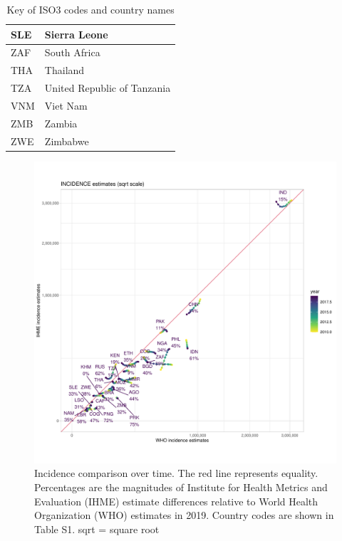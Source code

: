 \documentclass[12pt]{article}
\begin{document}
\begin{table}[]
\begin{tabular}{|l|l|}
SLE           & Sierra Leone                          \\ \hline
ZAF           & South Africa                          \\ \hline
THA           & Thailand                              \\ \hline
TZA           & United Republic of Tanzania           \\ \hline
VNM           & Viet Nam                              \\ \hline
ZMB           & Zambia                                \\ \hline
ZWE           & Zimbabwe                              \\ \hline
\end{tabular}
\caption{Key of ISO3 codes and country names}
\end{table}


\begin{figure}
  \centering
  \includegraphics[width=1\textwidth]{../plots/aF2a.pdf}
  \caption[Incidence comparison over time]{Incidence comparison over time. The
    red line represents equality. Percentages are the magnitudes of Institute for Health Metrics
    and Evaluation (IHME) estimate differences relative to World Health Organization (WHO)
    estimates in 2019. Country codes are shown in Table S1. sqrt = square root}
\end{figure}
\end{document}
